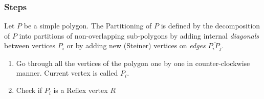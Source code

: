 \subsubsection{Steps}
Let $P$ be a simple polygon.  The Partitioning of $P$ is defined by the decomposition of $P$ into partitions of non-overlapping sub-polygons by adding internal {\em diagonals} between vertices  $P_i$ or by adding new (Steiner) vertices on {\em edges} $\overline{P_i P_j}$. 

\begin{enumerate}

\item 
Go through all the vertices of the polygon one by one in counter-clockwise manner. Current vertex is called $P_i$.%


\item 
Check if $P_i$ is a Reflex vertex $R$%





\end{enumerate}
